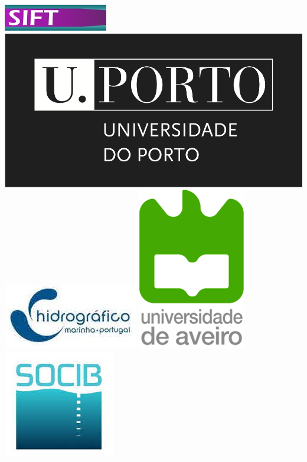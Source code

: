 \begin{titlepage}
\includegraphics[scale=0.8]{fig/Sift_logo.png}
\hspace{+0.4cm}\includegraphics[scale=0.25]{fig/uporto.png}
\hspace{+0.4cm}\includegraphics[scale=0.3]{fig/ih.jpg}
\hspace{+0.4cm}\includegraphics[scale=0.18]{fig/aveiro.png}
\hspace{+0.4cm}\includegraphics[scale=0.3]{fig/socib.jpg}

\end{titlepage}
